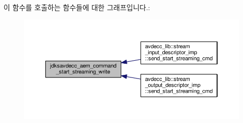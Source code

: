 이 함수를 호출하는 함수들에 대한 그래프입니다.\+:
\nopagebreak
\begin{figure}[H]
\begin{center}
\leavevmode
\includegraphics[width=350pt]{group__command__start__streaming_ga7bd7788fdc598aee7b74a487c1a8e03a_icgraph}
\end{center}
\end{figure}


